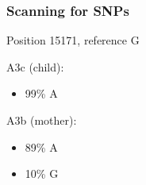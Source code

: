 \documentclass[slidestop,14pt]{beamer}
\begin{document}
{
  \frame{}
}

\begin{frame}
  \frametitle{Scanning for SNPs}

  \vspace{\baselineskip}

  Position 15171, reference G

  \vspace{\baselineskip}

  A3c (child):
  \begin{itemize}
    \item 99\% {\color{Red} A}
  \end{itemize}

  \vspace{\baselineskip}

  A3b (mother):
  \begin{itemize}
    \item 89\% {\color{Red} A}
    \item 10\% {\color{Green} G}
  \end{itemize}
\end{frame}
\end{document}
